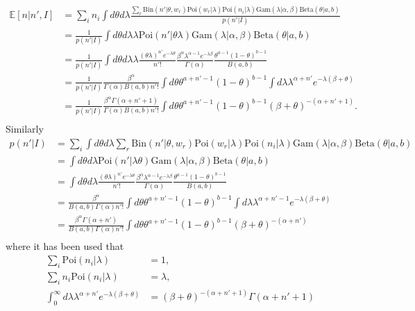 \begin{equation}
	\begin{split}
		\mathbb{E}[n|n',I] & = \sum_i n_i\int d\theta d\lambda  \frac{\sum_r \text{Bin}(n'|\theta,w_r) \text{Poi}(w_r|\lambda)\text{Poi}(n_i|\lambda)\text{Gam}(\lambda|\alpha,\beta)\text{Beta}(\theta|a,b)}{p(n'|I)}\\
		&=\frac{1}{p(n'|I)}\int d\theta d\lambda \lambda \text{Poi}(n'|\theta\lambda)\text{Gam}(\lambda|\alpha,\beta)\text{Beta}(\theta|a,b)\\
		&=\frac{1}{p(n'|I)}\int d\theta d\lambda \lambda \frac{(\theta\lambda)^{n'}e^{-\lambda\theta}}{n'!}\frac{\beta^\alpha\lambda^{\alpha-1}e^{-\lambda \beta}}{\Gamma(\alpha)}\frac{\theta^{a-1}(1-\theta)^{b-1}}{B(a,b)}\\
		&=\frac{1}{p(n'|I)}\frac{\beta^\alpha}{\Gamma(\alpha)B(a,b)n'!}\int d\theta\theta^{a+n'-1}(1-\theta)^{b-1} \int d\lambda  \lambda^{\alpha+n'}e^{-\lambda (\beta+\theta)}\\
		&=\frac{1}{p(n'|I)}\frac{\beta^\alpha\Gamma(\alpha+n'+1)}{\Gamma(\alpha)B(a,b)n'!}\int d\theta\theta^{a+n'-1}(1-\theta)^{b-1} (\beta+\theta)^{-(\alpha+n'+1)}.\\
	\end{split}
\end{equation}
Similarly
\begin{equation}
	\begin{split}
		p(n'|I) &= \sum_i \int d\theta d\lambda  \sum_r \text{Bin}(n'|\theta,w_r) \text{Poi}(w_r|\lambda)\text{Poi}(n_i|\lambda)\text{Gam}(\lambda|\alpha,\beta)\text{Beta}(\theta|a,b)\\
		&=  \int d\theta d\lambda  \text{Poi}(n'|\lambda\theta)\text{Gam}(\lambda|\alpha,\beta)\text{Beta}(\theta|a,b)\\
		&=\int d\theta d\lambda  \frac{(\theta\lambda)^{n'}e^{-\lambda\theta}}{n'!}\frac{\beta^\alpha\lambda^{\alpha-1}e^{-\lambda \beta}}{\Gamma(\alpha)}\frac{\theta^{a-1}(1-\theta)^{b-1}}{B(a,b)}\\
		&=\frac{\beta^\alpha}{B(a,b)\Gamma(\alpha)n'!}\int d\theta \theta^{a+n'-1}(1-\theta)^{b-1} \int d\lambda  \lambda^{\alpha+n'-1}e^{-\lambda (\beta+\theta)}\\
		&=\frac{\beta^\alpha\Gamma(\alpha+n')}{B(a,b)\Gamma(\alpha)n'!}\int d\theta \theta^{a+n'-1}(1-\theta)^{b-1} (\beta+\theta)^{-(\alpha+n')}\\
	\end{split}
\end{equation}
where it has been used that
\begin{equation}
	\begin{split}
		\sum_i\text{Poi}(n_i|\lambda)&=1,\\
		\sum_in_i\text{Poi}(n_i|\lambda)&=\lambda,\\
		\int_0^\infty d\lambda  \lambda^{\alpha+n'}e^{-\lambda (\beta+\theta)} &= (\beta+\theta)^{-(\alpha+n'+1)}\Gamma(\alpha+n'+1)\\
	\end{split}
\end{equation}

